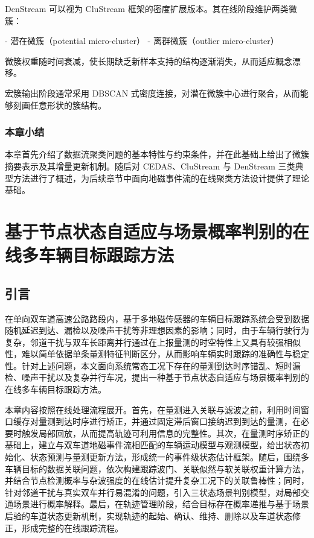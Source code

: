 \documentclass{xdupgthesis}
\begin{document}
DenStream 可以视为 CluStream 框架的密度扩展版本。其在线阶段维护两类微簇：

- 潜在微簇（potential micro-cluster）
- 离群微簇（outlier micro-cluster）

微簇权重随时间衰减，使长期缺乏新样本支持的结构逐渐消失，从而适应概念漂移。

宏簇输出阶段通常采用 DBSCAN 式密度连接，对潜在微簇中心进行聚合，从而能够刻画任意形状的簇结构。



\subsection{本章小结}

本章首先介绍了数据流聚类问题的基本特性与约束条件，并在此基础上给出了微簇摘要表示及其增量更新机制。随后对 CEDAS、CluStream 与 DenStream 三类典型方法进行了概述，为后续章节中面向地磁事件流的在线聚类方法设计提供了理论基础。


\chapter{基于节点状态自适应与场景概率判别的在线多车辆目标跟踪方法}
\label{chap:online_tracking}

\section{引言}

在单向双车道高速公路路段内，基于多地磁传感器的车辆目标跟踪系统会受到数据随机延迟到达、漏检以及噪声干扰等非理想因素的影响；同时，由于车辆行驶行为复杂，邻道干扰与双车长距离并行通过在上报量测的时空特性上又具有较强相似性，难以简单依据单条量测特征判断区分，从而影响车辆实时跟踪的准确性与稳定性。针对上述问题，本文面向系统常态工况下存在的量测到达时序错乱、短时漏检、噪声干扰以及复杂并行车况，提出一种基于节点状态自适应与场景概率判别的在线多车辆目标跟踪方法。

本章内容按照在线处理流程展开。首先，在量测进入关联与滤波之前，利用时间窗口缓存对量测到达时序进行矫正，并通过固定滞后窗口接纳迟到到达的量测，在必要时触发局部回放，从而提高轨迹可利用信息的完整性。其次，在量测时序矫正的基础上，建立与双车道地磁事件流相匹配的车辆运动模型与观测模型，给出状态初始化、状态预测与量测更新方法，形成统一的事件级状态估计框架。随后，围绕多车辆目标的数据关联问题，依次构建跟踪波门、关联似然与软关联权重计算方法，并结合节点检测概率与杂波强度的在线估计提升复杂工况下的关联鲁棒性；同时，针对邻道干扰与真实双车并行易混淆的问题，引入三状态场景判别模型，对局部交通场景进行概率解释。最后，在轨迹管理阶段，结合目标存在概率递推与基于场景后验的车道状态更新机制，实现轨迹的起始、确认、维持、删除以及车道状态修正，形成完整的在线跟踪流程。
\end{document}
